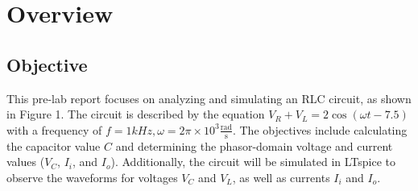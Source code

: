 \chapter{Overview}

\section{Objective}

This pre-lab report focuses on analyzing and simulating an RLC circuit, as shown in Figure 1. The circuit is described by the equation $V_R + V_L = 2\cos (\omega t - 7.5)$ with a frequency of $f = 1kHz, \omega = 2\pi \times 10^3 \frac{\text{rad}}{\text{s}}$. The objectives include calculating the capacitor value $C$ and determining the phasor-domain voltage and current values ($V_C$, $I_i$, and $I_o$). Additionally, the circuit will be simulated in LTspice to observe the waveforms for voltages $V_C$ and $V_L$, as well as currents $I_i$ and $I_o$.
